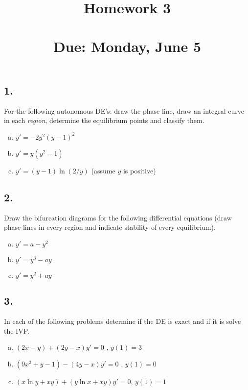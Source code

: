

\title{Homework 3 \\ \hfill \\ Due: Monday, June 5}


\maketitle

\thispagestyle{fancy}







\subsection*{1. }
For the following autonomous DE's: draw the phase line, draw an integral curve in each \emph{region}, determine the equilibrium points and classify them.

\begin{enumerate}[a)]
	\item $y' = -2 y^2(y -1) ^ 2 $
	\item $y' = y (y^2 -1) $
	\item $ y' = (y-1) \ln (2 / y) $ (assume $ y $ is positive)
\end{enumerate}
\vspace{1em}



\subsection*{2. }
Draw the bifurcation diagrams for the following differential equations (draw phase lines in every region and indicate stability of every equilibrium).
\begin{enumerate}[a)]
	\item $y' = a - y^2$
	\item $y' = y^3 - ay$
	\item $y' = y^2 + ay$
\end{enumerate}
\vspace{1em}



\subsection*{3. }
In each of the following problems determine if the DE is exact and if it is solve the IVP.
\begin{enumerate}[a)]
	\item $ (2x - y) + (2y - x) y' = 0 $ , $ y(1) = 3 $
	\item $ (9 x ^ 2 + y - 1) - (4y - x) y' =0 $ , $ y(1) = 0 $
	\item $ (x \ln y + xy) + (y \ln x + xy) y ' = 0$, $ y(1) = 1 $
\end{enumerate}
\vspace{1em}


